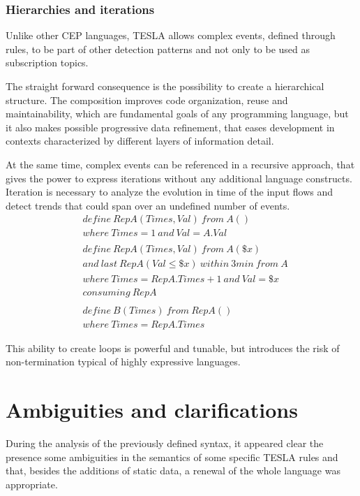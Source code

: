 \subsubsection{Hierarchies and iterations}
Unlike other CEP languages, TESLA allows complex events, defined through rules, to be part of other detection patterns and not only to be used as subscription topics.

The straight forward consequence is the possibility to create a hierarchical structure. The composition improves code organization, reuse and maintainability, which are fundamental goals of any programming language, but it also makes possible progressive data refinement, that eases development in contexts characterized by different layers of information detail.

At the same time, complex events can be referenced in a recursive approach, that gives the power to express iterations without any additional language constructs. Iteration is necessary to analyze the evolution in time of the input flows and detect trends that could span over an undefined number of events.
\begin{align*}
&define\ RepA(Times, Val)\ from\ A()\\
&where\ Times=1\ and\ Val=A.Val\\
\\
&define\ RepA(Times, Val)\ from\ A(\$x)\\
&and\ last\ RepA(Val \le \$x)\ within\ 3 min\ from\ A\\
&where\ Times=RepA.Times+1\ and\ Val = \$x\\
&consuming\ RepA\\\\
&define\ B(Times)\ from\ RepA()\\
&where\ Times=RepA.Times
\end{align*}

This ability to create loops is powerful and tunable, but introduces the risk of non-termination typical of highly expressive languages.

\section{Ambiguities and clarifications}

During the analysis of the previously defined syntax, it appeared clear the presence some ambiguities in the semantics of some specific TESLA rules and that, besides the additions of static data, a renewal of the whole language was appropriate.

